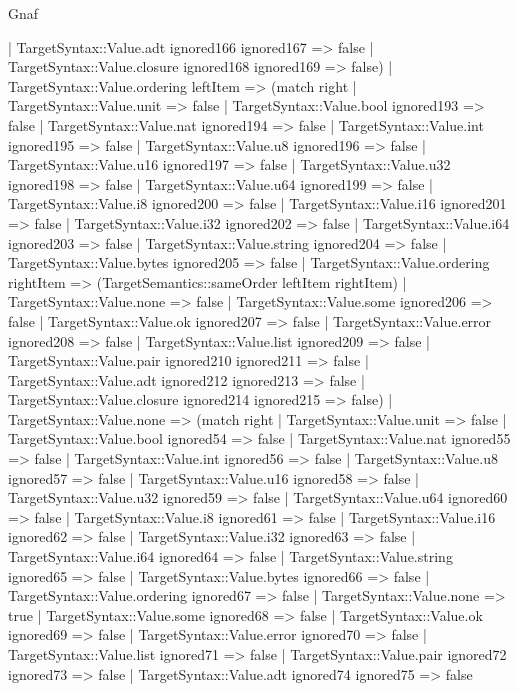 \begin{lexlean}{Gnaf}
\begin{semanticmodule}
{      | TargetSyntax::Value.adt ignored166 ignored167 => false
      | TargetSyntax::Value.closure ignored168 ignored169 => false)
    | TargetSyntax::Value.ordering leftItem => (match right
      | TargetSyntax::Value.unit => false
      | TargetSyntax::Value.bool ignored193 => false
      | TargetSyntax::Value.nat ignored194 => false
      | TargetSyntax::Value.int ignored195 => false
      | TargetSyntax::Value.u8 ignored196 => false
      | TargetSyntax::Value.u16 ignored197 => false
      | TargetSyntax::Value.u32 ignored198 => false
      | TargetSyntax::Value.u64 ignored199 => false
      | TargetSyntax::Value.i8 ignored200 => false
      | TargetSyntax::Value.i16 ignored201 => false
      | TargetSyntax::Value.i32 ignored202 => false
      | TargetSyntax::Value.i64 ignored203 => false
      | TargetSyntax::Value.string ignored204 => false
      | TargetSyntax::Value.bytes ignored205 => false
      | TargetSyntax::Value.ordering rightItem => (TargetSemantics::sameOrder leftItem rightItem)
      | TargetSyntax::Value.none => false
      | TargetSyntax::Value.some ignored206 => false
      | TargetSyntax::Value.ok ignored207 => false
      | TargetSyntax::Value.error ignored208 => false
      | TargetSyntax::Value.list ignored209 => false
      | TargetSyntax::Value.pair ignored210 ignored211 => false
      | TargetSyntax::Value.adt ignored212 ignored213 => false
      | TargetSyntax::Value.closure ignored214 ignored215 => false)
    | TargetSyntax::Value.none => (match right
      | TargetSyntax::Value.unit => false
      | TargetSyntax::Value.bool ignored54 => false
      | TargetSyntax::Value.nat ignored55 => false
      | TargetSyntax::Value.int ignored56 => false
      | TargetSyntax::Value.u8 ignored57 => false
      | TargetSyntax::Value.u16 ignored58 => false
      | TargetSyntax::Value.u32 ignored59 => false
      | TargetSyntax::Value.u64 ignored60 => false
      | TargetSyntax::Value.i8 ignored61 => false
      | TargetSyntax::Value.i16 ignored62 => false
      | TargetSyntax::Value.i32 ignored63 => false
      | TargetSyntax::Value.i64 ignored64 => false
      | TargetSyntax::Value.string ignored65 => false
      | TargetSyntax::Value.bytes ignored66 => false
      | TargetSyntax::Value.ordering ignored67 => false
      | TargetSyntax::Value.none => true
      | TargetSyntax::Value.some ignored68 => false
      | TargetSyntax::Value.ok ignored69 => false
      | TargetSyntax::Value.error ignored70 => false
      | TargetSyntax::Value.list ignored71 => false
      | TargetSyntax::Value.pair ignored72 ignored73 => false
      | TargetSyntax::Value.adt ignored74 ignored75 => false
}
\end{semanticmodule}
\end{lexlean}
